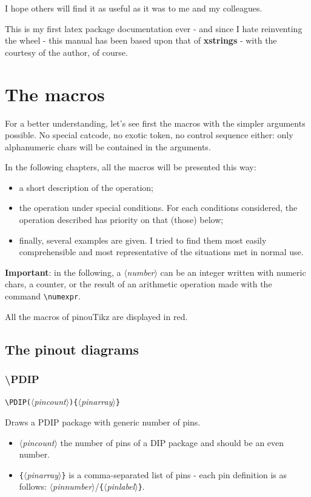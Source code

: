\documentclass[english,a4paper,10pt]{article}
\newcommand\argu[1]{$\langle$\textit{#1}$\rangle$}
\newcommand\ARGU[1]{\texttt{\{}\argu{#1}\texttt{\}}}
\newcommand\arguD[1]{\texttt{(}\argu{#1}\texttt{)}}
\newcommand\pinouTikz{\textsf{pinouTikz}\xspace}
\newcommand\verbinline{\lstinline[basicstyle=\normalsize\ttfamily]}
\begin{document}
I hope others will find it as useful as it was to me and my colleagues.

This is my first latex package documentation ever - and since I hate reinventing the wheel - this manual has been based upon that of \textbf{xstrings} - with the courtesy of the author, of course.

\section{The macros}
For a better understanding, let's see first the macros with the simpler arguments possible. No special catcode, no exotic token, no control sequence either: only alphanumeric chars will be contained in the arguments.\medskip

In the following chapters, all the macros will be presented this way:
\begin{itemize}
	\item a short description of the operation;
	\item the operation under special conditions. For each conditions considered, the operation described has priority on that (those) below;
	\item finally, several examples are given. I tried to find them most easily comprehensible and most representative of the situations met in normal use.
\end{itemize}\smallskip

\textbf{Important}: in the following, a \argu{number} can be an integer written with numeric chars, a counter, or the result of an arithmetic operation made with the command \verbinline|\numexpr|.\smallskip

All the macros of \pinouTikz are displayed in {\makeatletter\color{@xs@keywordspinouTikz}red}.

\subsection{The pinout diagrams}
\subsubsection{\ttfamily\textbackslash PDIP}
\verbinline|\PDIP|\arguD{pincount}\ARGU{pinarray}
\smallskip

Draws a PDIP package with generic number of pins.

\begin{itemize}
	\item \argu{pincount} the  number of pins of a DIP package and should be an even number.
	\item \ARGU{pinarray} is a comma-separated list of pins  - each pin definition is as follows: \argu{pinnumber}/\ARGU{pinlabel}.
\end{itemize}
\end{document}
